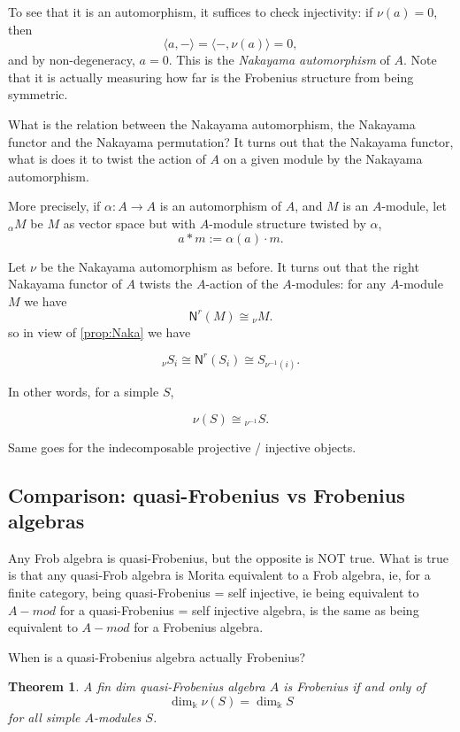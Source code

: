 \documentclass[11pt]{article}
\newtheorem{theorem}{Theorem}[section]
\theoremstyle{definition}
\begin{document}
To see that it is an automorphism, it suffices to check injectivity: if $\nu(a) = 0$, then
\[
\langle a, - \rangle = \langle -, \nu(a) \rangle = 0,
\]
and by non-degeneracy, $a = 0$. This is the \textit{Nakayama automorphism }of $A$. Note that it is actually measuring how far is the Frobenius structure from being symmetric.




What is the relation between the Nakayama automorphism, the Nakayama functor and the Nakayama permutation? It turns out that the Nakayama functor, what is does it to twist the action of $A$ on a given module by the Nakayama automorphism.


More precisely, if $\alpha: A \to A$ is an automorphism of $A$, and $M$ is an $A$-module, let ${}_{\alpha} M$ be $M$ as vector space but with $A$-module structure twisted by $\alpha$,
$$ a * m := \alpha (a) \cdot m. $$


Let $\nu$ be the Nakayama automorphism as before. It turns out that the right Nakayama functor of $A$ twists the $A$-action of the $A$-modules: for any $A$-module $M$ we have
\begin{equation}
\mathsf{N}^r (M) \cong {}_\nu M. 
\end{equation}
so in view of \cref{prop:Naka} we have

$$ {}_\nu S_i \cong \mathsf{N}^r(S_i)\cong S_{\nu^{-1}(i)}.  $$


In other words, for a simple $S$, 

$$ \nu (S) \cong {}_{\nu^{-1}} S.  $$


Same goes for the indecomposable projective / injective objects.

\subsection{Comparison: quasi-Frobenius vs Frobenius algebras}


Any Frob algebra is quasi-Frobenius, but the opposite is NOT true. What is true is that any quasi-Frob algebra is Morita equivalent to a Frob algebra, ie, for a finite category, being quasi-Frobenius = self injective, ie being equivalent to $A-mod$ for a quasi-Frobenius = self injective algebra, is the same as being equivalent to $A-mod$ for a Frobenius algebra.



When is a quasi-Frobenius algebra actually Frobenius?



\begin{theorem}
A fin dim quasi-Frobenius algebra $A$ is Frobenius if and only of $$\dim_\Bbbk \nu(S) = \dim_\Bbbk S$$ for all simple $A$-modules $S$.
\end{theorem}
\end{document}
